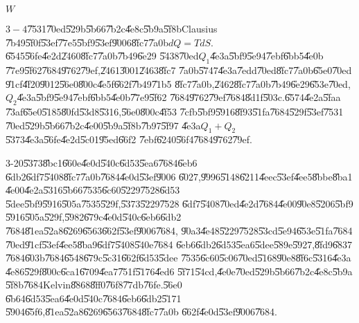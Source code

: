 \documentclass{article}
\begin{document}
$W$

$3-4$\U{7531}\U{70ed}\U{529b}\U{5b66}\U{7b2c}\U{4e8c}\U{5b9a}\U{5f8b}Clausius%
\U{7b49}\U{5f0f}\U{53ef}\U{77e5}\U{5bf9}\U{53ef}\U{9006}\U{8fc7}\U{7a0b}$%
dQ=TdS.$\U{6545}\U{56fe}\U{4e2d}\U{2460}\U{8fc7}\U{7a0b}\U{7b49}\U{6e29}%
\U{5438}\U{70ed}$Q_{1}$\U{4e3a}\U{5bf9}\U{5e94}\U{7ebf}\U{6bb5}\U{4e0b}%
\U{77e9}\U{5f62}\U{7684}\U{9762}\U{79ef},\U{2461}\U{3001}\U{2463}\U{8fc7}%
\U{7a0b}\U{5747}\U{4e3a}\U{7edd}\U{70ed}\U{8fc7}\U{7a0b}\U{65e0}\U{70ed}%
\U{91cf}\U{4f20}\U{9012}\U{56e0}\U{800c}\U{4e5f}\U{662f}\U{7b49}\U{71b5}%
\U{8fc7}\U{7a0b},\U{2462}\U{8fc7}\U{7a0b}\U{7b49}\U{6e29}\U{653e}\U{70ed},$%
Q_{2}$\U{4e3a}\U{5bf9}\U{5e94}\U{7ebf}\U{6bb5}\U{4e0b}\U{77e9}\U{5f62}%
\U{7684}\U{9762}\U{79ef}\U{7684}\U{8d1f}\U{503c}.\U{6574}\U{4e2a}\U{5faa}%
\U{73af}\U{65e0}\U{5185}\U{80fd}\U{53d8}\U{5316},\U{56e0}\U{800c}\U{4f53}%
\U{7cfb}\U{5bf9}\U{5916}\U{8f93}\U{51fa}\U{7684}\U{529f}\U{53ef}\U{7531}%
\U{70ed}\U{529b}\U{5b66}\U{7b2c}\U{4e00}\U{5b9a}\U{5f8b}\U{7b97}\U{5f97}%
\U{4e3a}$Q_{1}+Q_{2}$\U{5373}\U{4e3a}\U{56fe}\U{4e2d}\U{5c01}\U{95ed}\U{66f2}%
\U{7ebf}\U{6240}\U{56f4}\U{7684}\U{9762}\U{79ef}.

3-20\U{5373}\U{8bc1}\U{660e}\U{4e0d}\U{540c}\U{6d53}\U{5ea6}\U{7684}\U{6eb6}%
\U{6db2}\U{6df7}\U{5408}\U{8fc7}\U{7a0b}\U{7684}\U{4e0d}\U{53ef}\U{9006}%
\U{6027},\U{9996}\U{5148}\U{6211}\U{4eec}\U{53ef}\U{4ee5}\U{8bbe}\U{8ba1}%
\U{4e00}\U{4e2a}\U{5316}\U{5b66}\U{7535}\U{6c60}\U{5229}\U{7528}\U{6d53}%
\U{5dee}\U{5bf9}\U{5916}\U{505a}\U{7535}\U{529f},\U{5373}\U{5229}\U{7528}%
\U{6df7}\U{5408}\U{70ed}\U{4e2d}\U{7684}\U{4e00}\U{90e8}\U{5206}\U{5bf9}%
\U{5916}\U{505a}\U{529f},\U{5982}\U{679c}\U{4e0d}\U{540c}\U{6eb6}\U{6db2}%
\U{7684}\U{81ea}\U{52a8}\U{6269}\U{6563}\U{662f}\U{53ef}\U{9006}\U{7684},%
\U{90a3}\U{4e48}\U{5229}\U{7528}\U{53cd}\U{5e94}\U{653e}\U{51fa}\U{7684}%
\U{70ed}\U{91cf}\U{53ef}\U{4ee5}\U{8ba9}\U{6df7}\U{5408}\U{540e}\U{7684}%
\U{6eb6}\U{6db2}\U{6d53}\U{5ea6}\U{5dee}\U{589e}\U{5927},\U{8fd9}\U{6837}%
\U{7684}\U{603b}\U{7684}\U{6548}\U{679c}\U{5c31}\U{662f}\U{6d53}\U{5dee}%
\U{7535}\U{6c60}\U{5c06}\U{70ed}\U{5168}\U{90e8}\U{8f6c}\U{5316}\U{4e3a}%
\U{4e86}\U{529f}\U{800c}\U{6ca1}\U{6709}\U{4ea7}\U{751f}\U{5176}\U{4ed6}%
\U{5f71}\U{54cd},\U{4e0e}\U{70ed}\U{529b}\U{5b66}\U{7b2c}\U{4e8c}\U{5b9a}%
\U{5f8b}\U{7684}Kelvin\U{8868}\U{8ff0}\U{76f8}\U{77db}\U{76fe}.\U{56e0}%
\U{6b64}\U{6d53}\U{5ea6}\U{4e0d}\U{540c}\U{7684}\U{6eb6}\U{6db2}\U{5171}%
\U{5904}\U{65f6},\U{81ea}\U{52a8}\U{6269}\U{6563}\U{7684}\U{8fc7}\U{7a0b}%
\U{662f}\U{4e0d}\U{53ef}\U{9006}\U{7684}.
\end{document}
